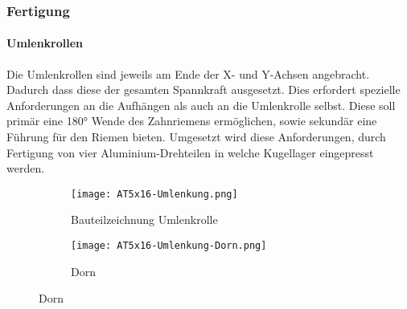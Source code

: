 \subsubsection{Fertigung}

\paragraph{Umlenkrollen}
Die Umlenkrollen sind jeweils am Ende der X- und Y-Achsen angebracht. Dadurch dass diese der gesamten Spannkraft ausgesetzt. Dies erfordert spezielle Anforderungen an die Aufhängen als auch an die Umlenkrolle selbst. Diese soll primär eine 180° Wende des Zahnriemens ermöglichen, sowie sekundär eine Führung für den Riemen bieten. 
Umgesetzt wird diese Anforderungen, durch Fertigung von vier Aluminium-Drehteilen in welche Kugellager eingepresst werden.

\begin{figure}[H]
    \centering
    \begin{subfigure}{.6\textwidth}
        \centering
        \texttt{[image: AT5x16-Umlenkung.png]}
        \caption{Bauteilzeichnung Umlenkrolle}
        \label{UmlenkrolleBTZ}
        
    \end{subfigure}%
    \begin{subfigure}{.4\textwidth}
        \centering
        \texttt{[image: AT5x16-Umlenkung-Dorn.png]}
        \caption{Dorn}
        \label{DornBTZ}
    \end{subfigure}
\end{figure}

